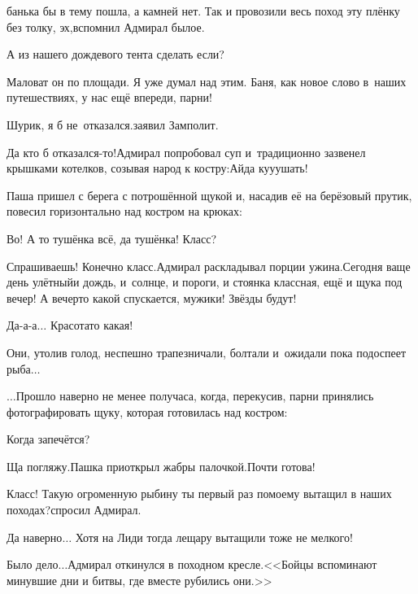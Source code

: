 \noindent банька бы в тему пошла, а камней нет. Так и провозили весь поход эту плёнку без толку, эх,\mdash вспомнил Адмирал былое.

\diagdash А из нашего дождевого тента сделать если?

\diagdash Маловат он по площади. Я уже думал над этим. Баня, как новое слово в~наших путешествиях, у нас ещё впереди, парни!

\diagdash Шурик, я б не~отказался.\mdash заявил Замполит.

\diagdash Да кто б отказался-то!\mdash Адмирал попробовал суп и~традиционно зазвенел крышками котелков, созывая народ к костру:\mdash Айда ку\sdash у\sdash ушать!

Паша пришел с берега с потрошённой щукой и, насадив её на берёзовый прутик, повесил горизонтально над костром на крюках:

\diagdash Во! А то тушёнка всё, да тушёнка! Класс?

\diagdash Спрашиваешь! Конечно класс.\mdash Адмирал раскладывал порции ужина.\mdash Сегодня ваще день улётный\mdash и дождь, и~солнце, и пороги, и стоянка классная, ещё и щука под вечер! А вечер\sdash то какой спускается, мужики! Звёзды будут!

\diagdash Да-а-а$\ldots$ Красота\sdash то какая!

Они, утолив голод, неспешно трапезничали, болтали и~ожидали пока подоспеет рыба$\ldots$

\vspace{0.5cm}
$\ldots$Прошло наверно не менее получаса, когда, перекусив, парни принялись фотографировать щуку, которая готовилась над костром:

\diagdash Когда запечётся?


\diagdash Ща погляжу.\mdash Пашка приоткрыл жабры палочкой.\mdash Почти готова!

\diagdash Класс! Такую огроменную рыбину ты первый раз по\sdash моему вытащил в наших походах?\mdash спросил Адмирал.

\diagdash Да наверно$\ldots$ Хотя на Лиди тогда лещару вытащили тоже не мелкого! 

\diagdash Было дело$\ldots$\mdash Адмирал откинулся в походном кресле.\mdash <<Бойцы вспоминают минувшие дни и битвы, где вместе рубились они.>>

